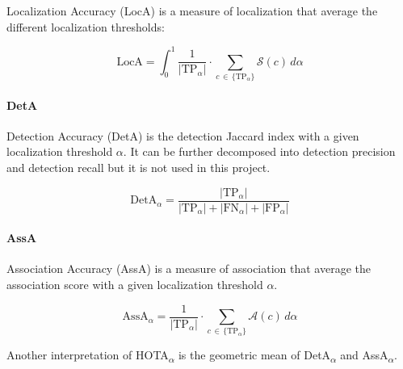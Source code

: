{
    Localization Accuracy (\ac{LocA}) is a measure of localization that average the different localization thresholds:
}

\begin{equation}
    \label{eqn:loca}
    \text{LocA} = \int_{0}^{1} \frac{1}{|\text{TP}_{\alpha}|} \cdot \sum_{c \, \in \, \{\text{TP}_{\alpha}\}} \mathcal{S}(c) \, d\alpha
\end{equation}

\paragraph{DetA}

{
    Detection Accuracy (\ac{DetA}) is the detection Jaccard index with a given localization threshold $\alpha$. It can be further decomposed into detection precision and detection recall but it is not used in this project.
}

\begin{equation}
    \label{eqn:deta}
    \text{DetA}_{\alpha} = \frac{|\text{TP}_{\alpha}|}{|\text{TP}_{\alpha}| + |\text{FN}_{\alpha}| + |\text{FP}_{\alpha}|}
\end{equation}

\paragraph{AssA}

{
    Association Accuracy (\ac{AssA}) is a measure of association that average the association score with a given localization threshold $\alpha$.
}

\begin{equation}
    \label{eqn:assa}
    \text{AssA}_{\alpha} = \frac{1}{|\text{TP}_{\alpha}|} \cdot \sum_{c \, \in \, \{\text{TP}_{\alpha}\}} \mathcal{A}(c) \, d\alpha
\end{equation}

{
    Another interpretation of \ac{HOTA}\textsubscript{$\alpha$} is the geometric mean of \ac{DetA}\textsubscript{$\alpha$} and \ac{AssA}\textsubscript{$\alpha$}.
}
